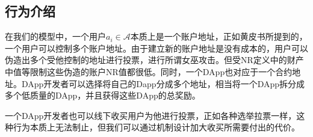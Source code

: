 \subsection{行为介绍}
在我们的模型中，一个用户$a_i \in \mathcal{A}$本质上是一个账户地址，正如黄皮书所提到的，一个用户可以控制多个账户地址。由于建立新的账户地址是没有成本的，用户可以伪造出多个受他控制的地址进行投票，进行所谓女巫攻击。但受NR定义中的财产中值等限制这些伪造的账户NR值都很低。同时，一个DApp也对应于一个合约地址。DApp开发者可以选择将自己的Dapp分成多个地址，相当将一个DApp拆分成多个低质量的DApp，并且获得这些DApp的总奖励。

一个DApp开发者也可以线下收买用户为他进行投票，正如各种选举拉票一样，这种行为本质上无法制止，但我们可以通过机制设计加大收买所需要付出的代价。